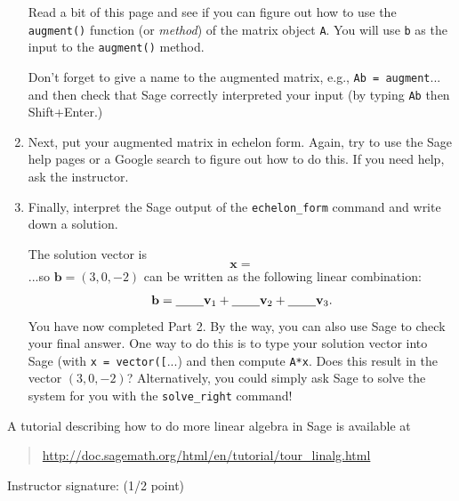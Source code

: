 \documentclass[fleqn,11pt]{paper}
\theoremstyle{remark}
\renewcommand{\vec}[1]{\mathbf{#1}}
\newcommand{\<}{\ensuremath{\langle}}
\renewcommand{\>}{\ensuremath{\rangle}}
\newcommand\vb{\vec{b}}
\newcommand\vv{\vec{v}}
\newcommand\vx{\vec{x}}
\begin{document}
\begin{enumerate}
      Read a bit of this page and see if you can 
      figure out how to use the {\tt augment()} function (or \emph{method}) of the matrix 
      object {\tt A}.
      You will use {\tt b} as the input to the  {\tt augment()} method.
      
      Don't forget to give a name to the augmented matrix, e.g., {\tt Ab = augment}... and then
      check that Sage correctly interpreted your input (by typing {\tt Ab} then Shift+Enter.)

    \item Next, put your augmented matrix in echelon form.  Again, try to use the Sage help pages
      or a Google search to figure out how to do this.  If you need help, ask the instructor.

    \item Finally, interpret the Sage output of the {\tt echelon\_form} command and write down a
      solution.
      
      The solution vector is 
\vskip5mm
\[\vx = \]
\vskip1cm
      ...so $\vb = (3, 0, -2)$ can be written as the following linear combination: 
\vskip5mm
\[
\vb = \text{\underline{\phantom{XXX}}}\vv_1 + \text{\underline{\phantom{XXX}}} \vv_2+
\text{\underline{\phantom{XXX}}} \vv_3.
\]
\vskip5mm
You have now completed Part 2.  By the way, you can also use Sage to check your final 
answer. One way to do this is to type your solution vector  
into Sage (with {\tt x = vector([}...) and then compute {\tt A*x}.  Does this result in the vector $(3, 0, -2)$?
Alternatively, you could simply ask Sage to solve the system for you with %
the {\tt solve\_right} command!
  \end{enumerate}
\vskip5mm
\noindent A tutorial describing how to do more linear algebra in Sage is available at
\begin{quote}
\url{http://doc.sagemath.org/html/en/tutorial/tour_linalg.html}
\end{quote}
\vskip 1cm
    Instructor signature: \underline{\phantom{XXXXXXXXXXXXXXXXXXXXXXXXXXXXXXXX}} (1/2 point)
\end{document}
